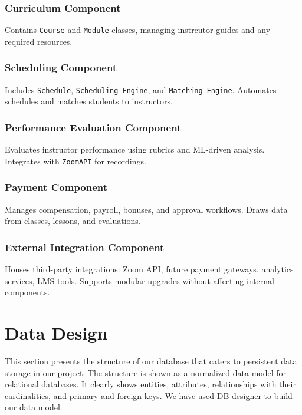 \subsubsection{Curriculum Component}
Contains \texttt{Course} and \texttt{Module} classes, managing instrcutor guides and any required resources.

\subsubsection{Scheduling Component}
Includes \texttt{Schedule}, \texttt{Scheduling Engine}, and \texttt{Matching Engine}. Automates schedules and matches students to instructors.

\subsubsection{Performance Evaluation Component}
Evaluates instructor performance using rubrics and ML-driven analysis. Integrates with \texttt{ZoomAPI} for recordings.

\subsubsection{Payment Component}
Manages compensation, payroll, bonuses, and approval workflows. Draws data from classes, lessons, and evaluations.


\subsubsection{External Integration Component}
Houses third-party integrations: Zoom API, future payment gateways, analytics services, LMS tools. Supports modular upgrades without affecting internal components.


\section{Data Design}

This section presents the structure of our database that caters to persistent data storage in our project. The structure is shown as a normalized data model for relational databases. It clearly shows entities, attributes, relationships with their cardinalities, and primary and foreign keys. We have used DB designer to build our data model.

